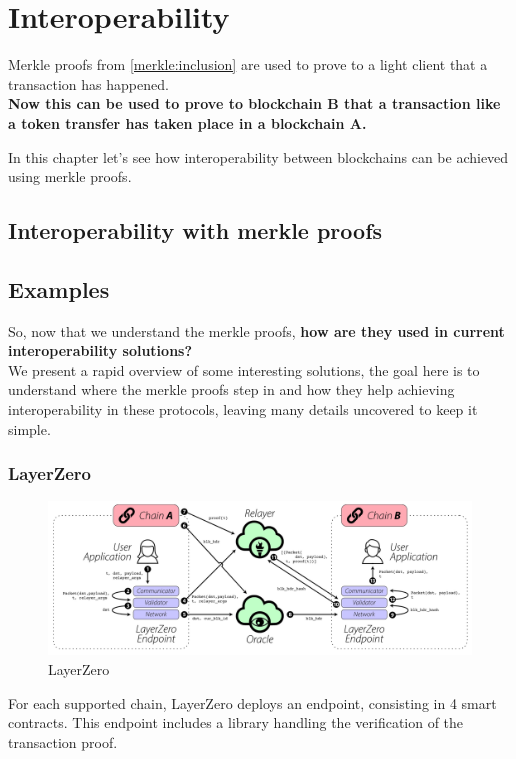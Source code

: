 \chapter{Interoperability}
Merkle proofs from \ref{merkle:inclusion} are used to prove to a light client that a transaction has happened. \\
\textbf{Now this can be used to prove to blockchain B that a transaction like a token transfer has taken place in a blockchain A.}

In this chapter let's see how interoperability between blockchains can be achieved using merkle proofs. 

\section{Interoperability with merkle proofs}

\section{Examples}
So, now that we understand the merkle proofs, \textbf{how are they used in current interoperability solutions?}
\\We present a rapid overview of some interesting solutions, the goal here is to understand where the merkle proofs step in and how they help achieving interoperability in these protocols, leaving many details uncovered to keep it simple.
\subsection{LayerZero \cite{zarick2021layerzero}}
\begin{figure}[H]
    \centering
\includegraphics[width=1.\linewidth]{interoperability/layerZero.png}
    \caption{LayerZero}
    \label{fig:layer_zero}
\end{figure}

For each supported chain, LayerZero deploys an endpoint, consisting in 4 smart contracts. This endpoint includes a library handling the verification of the transaction proof.


